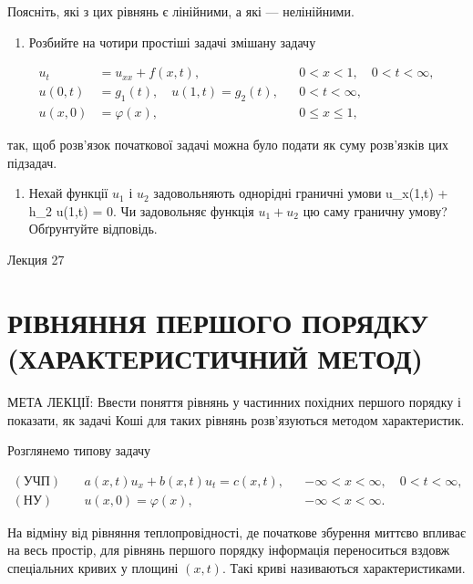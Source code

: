 \documentclass[
  ukrainian,
]{article}
\providecommand{\tightlist}{%
  \setlength{\itemsep}{0pt}\setlength{\parskip}{0pt}}
\begin{document}
Поясніть, які з цих рівнянь є лінійними, а які --- нелінійними.

\begin{enumerate}
\def\labelenumi{\arabic{enumi}.}
\setcounter{enumi}{4}
\tightlist
\item
  Розбийте на чотири простіші задачі змішану задачу
\end{enumerate}

\[
\begin{aligned}
u_t &= u_{xx} + f(x,t), && 0 < x < 1,\quad 0 < t < \infty, \\
u(0,t) &= g_1(t),\quad u(1,t) = g_2(t), && 0 < t < \infty, \\
u(x,0) &= \varphi(x), && 0 \leqslant x \leqslant 1,
\end{aligned}
\]

так, щоб розв'язок початкової задачі можна було подати як суму
розв'язків цих підзадач.

\begin{enumerate}
\def\labelenumi{\arabic{enumi}.}
\setcounter{enumi}{5}
\tightlist
\item
  Нехай функції \(u_1\) і \(u_2\) задовольняють однорідні граничні умови
  u\_x(1,t) + h\_2 u(1,t) = 0. Чи задовольняє функція \(u_1 + u_2\) цю
  саму граничну умову? Обґрунтуйте відповідь.
\end{enumerate}

Лекция 27

\section{РІВНЯННЯ ПЕРШОГО ПОРЯДКУ (ХАРАКТЕРИСТИЧНИЙ
МЕТОД)}\label{ux440ux456ux432ux43dux44fux43dux43dux44f-ux43fux435ux440ux448ux43eux433ux43e-ux43fux43eux440ux44fux434ux43aux443-ux445ux430ux440ux430ux43aux442ux435ux440ux438ux441ux442ux438ux447ux43dux438ux439-ux43cux435ux442ux43eux434}

МЕТА ЛЕКЦІЇ: Ввести поняття рівнянь у частинних похідних першого порядку
і показати, як задачі Коші для таких рівнянь розв'язуються методом
характеристик.

Розглянемо типову задачу

\[
\begin{aligned}
(\text{УЧП})\quad & a(x,t)u_x + b(x,t)u_t = c(x,t), && -\infty < x < \infty,\quad 0 < t < \infty, \\
(\text{НУ})\quad & u(x,0) = \varphi(x), && -\infty < x < \infty.
\end{aligned}
\]

На відміну від рівняння теплопровідності, де початкове збурення миттєво
впливає на весь простір, для рівнянь першого порядку інформація
переноситься вздовж спеціальних кривих у площині \((x,t)\). Такі криві
називаються характеристиками.
\end{document}
